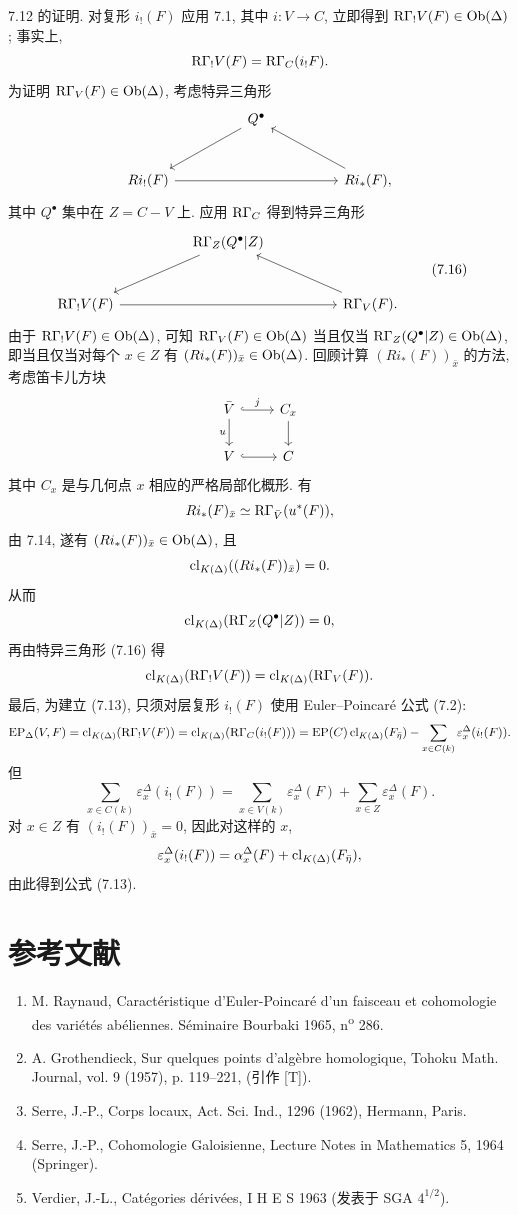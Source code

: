 7.12 的证明. 对复形 $i_!(F)$ 应用 7.1, 其中 $i:V\to C$, 立即得到 $\mathrm R\Gamma_!V(F)\in\operatorname{Ob}(\Delta)$; 事实上,
\[
\mathrm R\Gamma_!V(F)=\mathrm R\Gamma_C(i_!F).
\]
为证明 $\mathrm R\Gamma_V(F)\in\operatorname{Ob}(\Delta)$, 考虑特异三角形
\[
\begin{tikzcd}[column sep=huge,row sep=large]
& Q^\bullet \arrow[dl] &\\
Ri_!(F) \arrow[rr] && Ri_*(F) \arrow[ul],
\end{tikzcd}
\]
其中 $Q^\bullet$ 集中在 $Z=C-V$ 上. 应用 $\mathrm R\Gamma_C$ 得到特异三角形
\[
\begin{tikzcd}[column sep=huge,row sep=large]
& \RG_Z(Q^\bullet|Z) \arrow[dl] &\\
\RG_!V(F) \arrow[rr] && \RG_V(F) \arrow[ul].
\end{tikzcd}
\tag{7.16}
\]
由于 $\mathrm R\Gamma_!V(F)\in\operatorname{Ob}(\Delta)$, 可知 $\mathrm R\Gamma_V(F)\in\operatorname{Ob}(\Delta)$ 当且仅当 $\mathrm R\Gamma_Z(Q^\bullet|Z)\in\operatorname{Ob}(\Delta)$, 即当且仅当对每个 $x\in Z$ 有 $(Ri_*(F))_{\bar x}\in\operatorname{Ob}(\Delta)$. 回顾计算 $(Ri_*(F))_{\bar x}$ 的方法, 考虑笛卡儿方块
\[
\begin{tikzcd}
\bar V \arrow[r,hook,"j"] \arrow[d,"u"'] & C_x \arrow[d]\\
V \arrow[r,hook] & C
\end{tikzcd}
\]
其中 $C_x$ 是与几何点 $x$ 相应的严格局部化概形. 有
\[
Ri_*(F)_{\bar x}\simeq \mathrm R\Gamma_{\bar V}(u^*(F)),
\]
由 7.14, 遂有 $(Ri_*(F))_{\bar x}\in\operatorname{Ob}(\Delta)$, 且
\[
\operatorname{cl}_{K(\Delta)}((Ri_*(F))_{\bar x})=0.
\]
从而
\[
\operatorname{cl}_{K(\Delta)}(\mathrm R\Gamma_Z(Q^\bullet|Z))=0,
\]
再由特异三角形 (7.16) 得
\[
\operatorname{cl}_{K(\Delta)}(\mathrm R\Gamma_!V(F))=\operatorname{cl}_{K(\Delta)}(\mathrm R\Gamma_V(F)).
\]
最后, 为建立 (7.13), 只须对层复形 $i_!(F)$ 使用 Euler--Poincaré 公式 (7.2):
\[
\operatorname{EP}_\Delta(V,F)
=
\operatorname{cl}_{K(\Delta)}(\mathrm R\Gamma_!V(F))
=
\operatorname{cl}_{K(\Delta)}(\mathrm R\Gamma_C(i_!(F)))
=
\operatorname{EP}(C)\operatorname{cl}_{K(\Delta)}(F_{\bar\eta})
-\sum_{x\in C(k)}\varepsilon_x^\Delta(i_!(F)).
\]
但
\[
\sum_{x\in C(k)}\varepsilon_x^\Delta(i_!(F))
=
\sum_{x\in V(k)}\varepsilon_x^\Delta(F)
+\sum_{x\in Z}\varepsilon_x^\Delta(F).
\]
对 $x\in Z$ 有 $(i_!(F))_{\bar x}=0$, 因此对这样的 $x$,
\[
\varepsilon_x^\Delta(i_!(F))
=
\alpha_x^\Delta(F)+\operatorname{cl}_{K(\Delta)}(F_{\bar\eta}),
\]
由此得到公式 (7.13).

\section*{参考文献}

\begin{enumerate}
\item[{[1]}] M. Raynaud, Caractéristique d'Euler-Poincaré d'un faisceau et cohomologie des variétés abéliennes. Séminaire Bourbaki 1965, n\textsuperscript{o} 286.
\item[{[2]}] A. Grothendieck, Sur quelques points d'algèbre homologique, Tohoku Math. Journal, vol. 9 (1957), p. 119--221, (引作 [T]).
\item[{[3]}] Serre, J.-P., Corps locaux, Act. Sci. Ind., 1296 (1962), Hermann, Paris.
\item[{[4]}] Serre, J.-P., Cohomologie Galoisienne, Lecture Notes in Mathematics 5, 1964 (Springer).
\item[{[5]}] Verdier, J.-L., Catégories dérivées, I H E S 1963 (发表于 SGA $4^{1/2}$).
\end{enumerate}


